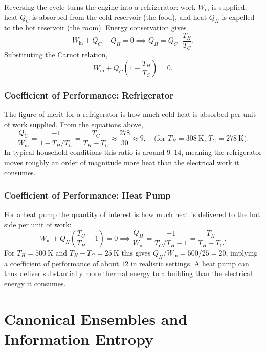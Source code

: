 Reversing the cycle turns the engine into a refrigerator: work $W_{\text{in}}$ is supplied, heat $Q_C$ is absorbed from the cold reservoir (the food), and heat $Q_H$ is expelled to the hot reservoir (the room). Energy conservation gives
\begin{equation}
    W_{\text{in}} + Q_C - Q_H = 0 \implies Q_H = Q_C \cdot \frac{T_H}{T_C}.
\end{equation}
Substituting the Carnot relation,
\begin{equation}
    W_{\text{in}} + Q_C\!\left(1 - \frac{T_H}{T_C}\right) = 0.
\end{equation}

\subsection{Coefficient of Performance: Refrigerator}

The figure of merit for a refrigerator is how much cold heat is absorbed per unit of work supplied. From the equations above,
\begin{equation}
    \frac{Q_C}{W_{\text{in}}} = \frac{-1}{1 - T_H/T_C} = \frac{T_C}{T_H - T_C} \approx \frac{278}{30} \approx 9, \quad \text{(for } T_H = 308\ \mathrm{K},\, T_C = 278\ \mathrm{K}\text{)}.
\end{equation}
In typical household conditions this ratio is around $9$--$14$, meaning the refrigerator moves roughly an order of magnitude more heat than the electrical work it consumes.

\subsection{Coefficient of Performance: Heat Pump}

For a heat pump the quantity of interest is how much heat is delivered to the hot side per unit of work:
\begin{equation}
    W_{\text{in}} + Q_H\!\left(\frac{T_C}{T_H} - 1\right) = 0
    \implies \frac{Q_H}{W_{\text{in}}} = \frac{-1}{T_C/T_H - 1} = \frac{T_H}{T_H - T_C}.
\end{equation}
For $T_H = 500\ \mathrm{K}$ and $T_H - T_C = 25\ \mathrm{K}$ this gives $Q_H/W_{\text{in}} = 500/25 = 20$, implying a coefficient of performance of about $12$ in realistic settings. A heat pump can thus deliver substantially more thermal energy to a building than the electrical energy it consumes.

\chapter{Canonical Ensembles and Information Entropy}

